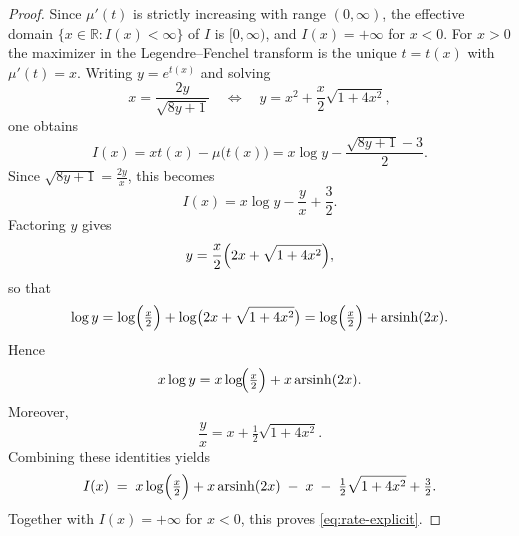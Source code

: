 \documentclass[11pt,a4paper]{article}
\numberwithin{equation}{section}
\def\RR{\mathbb{R}}
\def\arsinh{\mathrm{arsinh}}
\begin{document}
\begin{proof}
Since $\mu'(t)$ is strictly increasing with range $(0,\infty)$, the effective domain $\{x\in\RR:I(x)<\infty\}$ of $I$ is $[0,\infty)$, and $I(x)=+\infty$ for $x<0$. For $x>0$ the maximizer in the Legendre--Fenchel transform is the unique $t=t(x)$ with $\mu'(t)=x$. Writing $y=e^{t(x)}$ and solving
\begin{equation*}
x=\frac{2y}{\sqrt{8y+1}}
\quad\Longleftrightarrow\quad
y=x^2+\frac{x}{2}\sqrt{1+4x^2},
\end{equation*}
one obtains
\begin{equation*}
I(x)=xt(x)-\mu\bigl(t(x)\bigr)
= x\log y-\frac{\sqrt{8y+1}-3}{2}.
\end{equation*}
Since $\sqrt{8y+1} = \tfrac{2y}{x}$, this becomes
\begin{equation*}
I(x) = x\log y - \frac{y}{x} + \frac{3}{2}.
\end{equation*}
Factoring $y$ gives
\begin{equation*}
y = \frac{x}{2}\Bigl(2x+\sqrt{1+4x^2}\Bigr),
\end{equation*}
so that
\begin{equation*}
\log y = \log\Bigl(\tfrac{x}{2}\Bigr) + \log\bigl(2x+\sqrt{1+4x^2}\bigr)
= \log\Bigl(\tfrac{x}{2}\Bigr) + \arsinh(2x).
\end{equation*}
Hence
\begin{equation*}
x\log y = x\log\!\Bigl(\tfrac{x}{2}\Bigr) + x\,\arsinh(2x).
\end{equation*}
Moreover,
\begin{equation*}
\frac{y}{x} = x + \tfrac{1}{2}\sqrt{1+4x^2}.
\end{equation*}
Combining these identities yields
\begin{equation*}
I(x) \;=\; x\log\Bigl(\tfrac{x}{2}\Bigr) + x\,\arsinh(2x) \;-\; x 
\;-\; \tfrac{1}{2}\sqrt{1+4x^2} + \tfrac{3}{2}.
\end{equation*}
Together with $I(x)=+\infty$ for $x<0$, this proves \eqref{eq:rate-explicit}. 
\end{proof}
\end{document}
